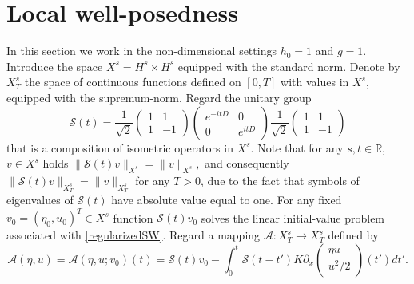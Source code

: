 \documentclass[reqno,12pt,a4paper]{article}
\theoremstyle{plain}
\begin{document}
\section{Local well-posedness}
\setcounter{equation}{0}
%
\noindent
%
%
In this section we work in the non-dimensional
settings $h_0 = 1$ and $g = 1$.
Introduce the space $X^s = H^s \times H^s$
equipped with the standard norm.
Denote by $X^s_T$ the space of continuous functions
defined on $[0, T]$ with values in $X^s$,
equipped with the supremum-norm.
%
%
Regard the unitary group
\[
	\mathcal S(t) =
	\frac 1{\sqrt 2}
	\begin{pmatrix}
		1 & 1
		\\
		1 & -1
	\end{pmatrix}
	\begin{pmatrix}
		e^{-itD} & 0
		\\
		0 & e^{itD}
	\end{pmatrix}
	\frac 1{\sqrt 2}
	\begin{pmatrix}
		1 & 1
		\\
		1 & -1
	\end{pmatrix}
\]
%
that is a composition of isometric operators in $X^s$.
Note that for any $s, t \in \mathbb R$,
$v \in X^s$ holds
\(
	\lVert \mathcal S(t)v \rVert_{X^s}
	=
	\lVert v \rVert_{X^s}
	,
\)
and consequently
\(
	\lVert \mathcal S(t)v \rVert_{X^s_T}
	=
	\lVert v \rVert_{X^s_T}
\)
for any $T>0$,
due to the fact that symbols of
eigenvalues of $\mathcal S(t)$ have absolute value
equal to one.
For any fixed $v_0 = (\eta_0, u_0)^T \in X^s$
function $\mathcal S(t)v_0$ solves the linear
initial-value problem associated with
\eqref{regularizedSW}.
Regard a mapping $\mathcal A : X^s_T \to X^s_T$
defined by
%
\begin{equation}
\label{contraction_mapping}
	\mathcal A(\eta, u) =
	\mathcal A(\eta, u; v_0)(t) = \mathcal S(t)v_0
	- \int_0^t \mathcal S(t - t') K \partial_x
	\begin{pmatrix}
		\eta u
		\\
		u^2 / 2
	\end{pmatrix}
	(t')dt'
	.
\end{equation}
\end{document}
